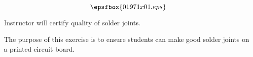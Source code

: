 

$$\epsfbox{01971x01.eps}$$

\vfil \eject






Instructor will certify quality of solder joints.







The purpose of this exercise is to ensure students can make good solder joints on a printed circuit board.




